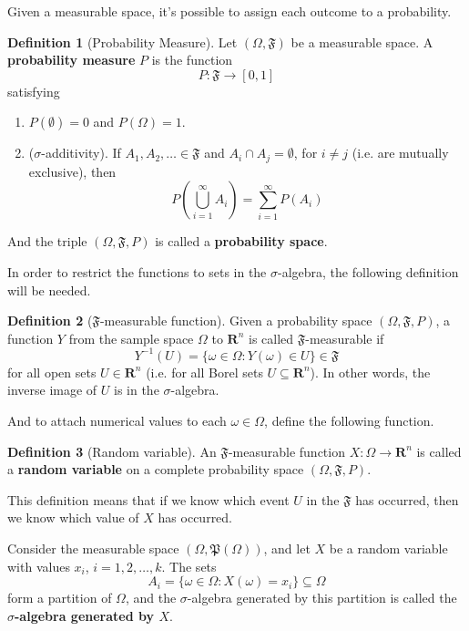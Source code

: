 \documentclass[12pt,a4paper]{article}
\theoremstyle{definition}
\newtheorem{definition}{Definition}[section]
\begin{document}
Given a measurable space, it's possible to assign each outcome to a probability.

\begin{definition}[Probability Measure]
	Let $(\Omega, \mathfrak{F})$ be a measurable space. A \textbf{probability measure} $P$ is the function
	\[
		P : \mathfrak{F} \longrightarrow [0,1]
	\]
	satisfying
	\begin{enumerate}
		\item $P(\emptyset) = 0$ and $P(\Omega) = 1$.
		\item ($\sigma$-additivity). If $A_1, A_2, \ldots \in \mathfrak{F}$ and $A_i \cap A_j = \emptyset$, for $i \neq j$ (i.e. are mutually exclusive), then \[ P \left( \bigcup_{i=1}^\infty A_i \right) = \sum_{i=1}^\infty P(A_i)\]
	\end{enumerate}
	
	And the triple $(\Omega, \mathfrak{F}, P)$ is called a \textbf{probability space}.
\end{definition}

In order to restrict the functions to sets in the $\sigma$-algebra, the following definition will be needed.

\begin{definition}[$\mathfrak{F}$-measurable function]
	Given a probability space $(\Omega, \mathfrak{F}, P)$, a function $Y$ from the sample space $\Omega$ to $\textbf{R}^n$ is called $\mathfrak{F}$-measurable if
	\[
		Y^{-1}(U) = \{ \omega \in \Omega : Y(\omega) \in U\} \in \mathfrak{F}
	\]
	for all open sets $U \in \textbf{R}^n$ (i.e. for all Borel sets $U \subseteq \textbf{R}^n$). In other words, the inverse image of $U$ is in the $\sigma$-algebra.
\end{definition} 

And to attach numerical values to each $\omega \in \Omega$, define the following function.


\begin{definition}[Random variable]
	An $\mathfrak{F}$-measurable function $X: \Omega \longrightarrow \textbf{R}^n$ is called a \textbf{random variable} on a complete probability space $(\Omega, \mathfrak{F}, P)$. 
\end{definition}

This definition means that if we know which event $U$ in the $\mathfrak{F}$ has occurred, then we know which value of $X$ has occurred. 

Consider the measurable space $(\Omega, \mathfrak{P}(\Omega))$, and let $X$ be a random variable with values $x_i$, $i = 1,2, \ldots, k$. The sets
\[
	A_i = \{ \omega \in \Omega : X(\omega) = x_i \} \subseteq \Omega
\]
form a partition of $\Omega$, and the $\sigma$-algebra generated by this partition is called the \textbf{$\sigma$-algebra generated by $X$}.
\end{document}

